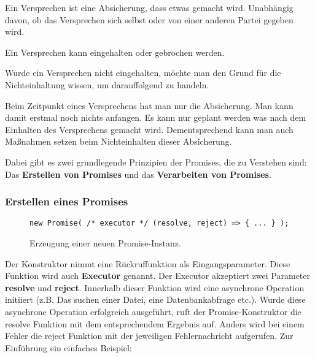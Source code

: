 \begin{description}
    \item Ein Versprechen ist eine Absicherung, dass etwas gemacht wird. Unabhängig davon, ob das Versprechen sich selbst oder von einer anderen Partei gegeben wird.
    
    \item Ein Versprechen kann eingehalten oder gebrochen werden.
    
    \item Wurde ein Versprechen nicht eingehalten, möchte man den Grund für die Nichteinhaltung wissen, um darauffolgend zu handeln.
    
    \item Beim Zeitpunkt eines Versprechens hat man nur die Absicherung. Man kann damit erstmal noch nichts anfangen. Es kann nur geplant werden was nach dem Einhalten des Versprechens gemacht wird. Dementsprechend kann man auch Maßnahmen setzen beim Nichteinhalten dieser Absicherung.
    
\end{description}

\noindent
Dabei gibt es zwei grundlegende Prinzipien der Promises, die zu Verstehen sind: Das \textbf{Erstellen von Promises} und das \textbf{Verarbeiten von Promises}.

\subsubsection{Erstellen eines Promises}

\begin{figure}[H]
\begin{lstlisting}[basicstyle=\small]
new Promise( /* executor */ (resolve, reject) => { ... } );
\end{lstlisting}
\caption{Erzeugung einer neuen Promise-Instanz.}
\end{figure}

Der Konstruktor nimmt eine Rückruffunktion als Eingangsparameter. Diese Funktion wird auch \textbf{Executor} genannt\cite{promise-executor}. Der Executor akzeptiert zwei Parameter \textbf{resolve} und \textbf{reject}. Innerhalb dieser Funktion wird eine asynchrone Operation initiiert (z.B. Das suchen einer Datei, eine Datenbankabfrage etc.). Wurde diese asynchrone Operation erfolgreich ausgeführt, ruft der Promise-Konstruktor die resolve Funktion mit dem entsprechendem Ergebnis auf. Anders wird bei einem Fehler die reject Funktion mit der jeweiligen Fehlernachricht aufgerufen. Zur Einführung ein einfaches Beispiel:\\

